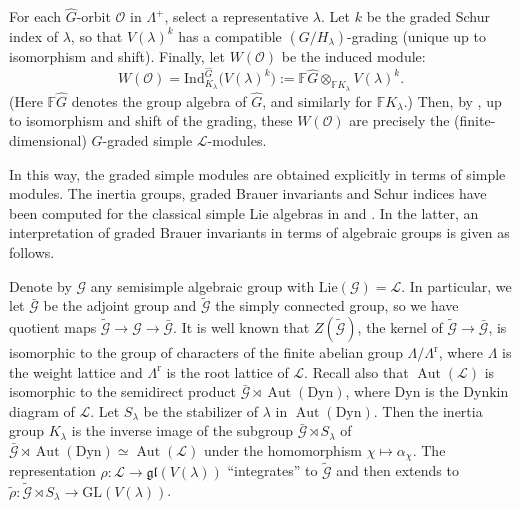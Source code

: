 \documentclass[a4paper,reqno]{amsart}
\theoremstyle{definition}
\numberwithin{theorem}{section}
\numberwithin{equation}{section}
\begin{document}
For each ${\widehat{{G}}}$-orbit ${\mathcal{O}}$ in $\Lambda^+$, select a representative $\lambda$. Let $k$ be the graded Schur index of $\lambda$, so that $V(\lambda)^k$ has a compatible $(G/H_\lambda)$-grading (unique up to isomorphism and shift). Finally, let $W({\mathcal{O}})$ be the induced module:
\[
W({\mathcal{O}})= {\mathrm{Ind}}_{K_\lambda}^{{\widehat{G}}}\bigl(V(\lambda)^k\bigr){:=} {\mathbb{F}}{\widehat{{G}}}\otimes_{{\mathbb{F}} K_\lambda}V(\lambda)^k.
\]
(Here ${\mathbb{F}} {\widehat{{G}}}$ denotes the group algebra of ${\widehat{{G}}}$, and similarly for ${\mathbb{F}} K_\lambda$.) Then, by \cite[Theorem 8]{EK_Israel}, up to isomorphism and shift of the grading, these $W({\mathcal{O}})$ are precisely the (finite-dimensional) $G$-graded simple ${\mathcal{L}}$-modules.

In this way, the graded simple modules are obtained explicitly in terms of simple modules. The inertia groups, graded Brauer invariants and Schur indices have been computed for the classical simple Lie algebras in \cite{EK_Israel} and \cite[Appendix~A]{EK_D4}. In the latter, an interpretation of graded Brauer invariants in terms of algebraic groups is given as follows. 

Denote by ${\mathcal{G}}$ any semisimple algebraic group with ${\mathrm{Lie}}({\mathcal{G}})={\mathcal{L}}$. In particular, we let $\bar{\mathcal{G}}$ be the adjoint group and $\tilde{\mathcal{G}}$ the simply connected group, so we have quotient maps $\tilde{\mathcal{G}}\to{\mathcal{G}}\to\bar{\mathcal{G}}$. It is well known that $Z(\tilde{\mathcal{G}})$, the kernel of $\tilde{\mathcal{G}}\to\bar{\mathcal{G}}$, is isomorphic to the group of characters of the finite abelian group $\Lambda/\Lambda^\mathrm{r}$, where $\Lambda$ is the weight lattice and $\Lambda^\mathrm{r}$ is the root lattice of ${\mathcal{L}}$. Recall also that $\operatorname{\mathrm{Aut}}({\mathcal{L}})$ is isomorphic to the semidirect product $\bar{\mathcal{G}}\rtimes\operatorname{\mathrm{Aut}}(\mathrm{Dyn})$, where $\mathrm{Dyn}$ is the Dynkin diagram of ${\mathcal{L}}$. Let $S_\lambda$ be the stabilizer of $\lambda$ in $\operatorname{\mathrm{Aut}}(\mathrm{Dyn})$. Then the inertia group $K_\lambda$ is the inverse image of the subgroup $\bar{\mathcal{G}}\rtimes S_\lambda$ of $\bar{\mathcal{G}}\rtimes\operatorname{\mathrm{Aut}}(\mathrm{Dyn})\simeq\operatorname{\mathrm{Aut}}({\mathcal{L}})$ under the homomorphism $\chi\mapsto\alpha_\chi$. The representation $\rho\colon{\mathcal{L}}\to{\mathfrak{gl}}(V(\lambda))$ ``integrates'' to $\tilde{\mathcal{G}}$ and then extends to $\tilde{\rho}\colon\tilde{\mathcal{G}}\rtimes S_\lambda\to{\mathrm{GL}}(V(\lambda))$.
\end{document}
